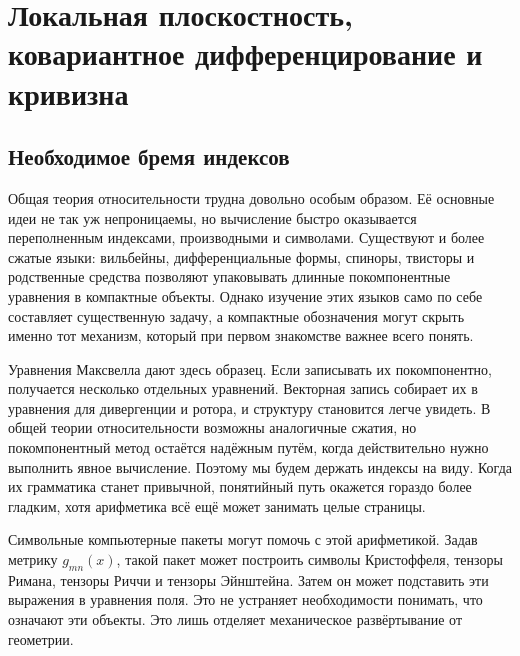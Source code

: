 \chapter{Локальная плоскостность, ковариантное дифференцирование и кривизна}


\section{Необходимое бремя индексов}

Общая теория относительности трудна довольно особым образом. Её основные идеи не так уж непроницаемы, но вычисление быстро оказывается переполненным индексами, производными и символами. Существуют и более сжатые языки: вильбейны, дифференциальные формы, спиноры, твисторы и родственные средства позволяют упаковывать длинные покомпонентные уравнения в компактные объекты. Однако изучение этих языков само по себе составляет существенную задачу, а компактные обозначения могут скрыть именно тот механизм, который при первом знакомстве важнее всего понять.

Уравнения Максвелла дают здесь образец. Если записывать их покомпонентно, получается несколько отдельных уравнений. Векторная запись собирает их в уравнения для дивергенции и ротора, и структуру становится легче увидеть. В общей теории относительности возможны аналогичные сжатия, но покомпонентный метод остаётся надёжным путём, когда действительно нужно выполнить явное вычисление. Поэтому мы будем держать индексы на виду. Когда их грамматика станет привычной, понятийный путь окажется гораздо более гладким, хотя арифметика всё ещё может занимать целые страницы.

Символьные компьютерные пакеты могут помочь с этой арифметикой. Задав метрику \(g_{mn}(x)\), такой пакет может построить символы Кристоффеля, тензоры Римана, тензоры Риччи и тензоры Эйнштейна. Затем он может подставить эти выражения в уравнения поля. Это не устраняет необходимости понимать, что означают эти объекты. Это лишь отделяет механическое развёртывание от геометрии.

